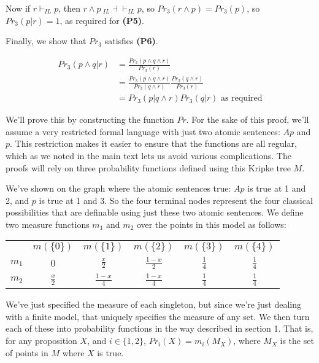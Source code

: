 Now if $r \vdash_{IL} p$, then $r \wedge p ~_{IL}\dashv \vdash_{IL} p$, so $Pr_3(r \wedge p) = Pr_3(p)$, so $Pr_3(p | r) = 1$, as required for \textbf{(P5)}.

Finally, we show that $Pr_3$ satisfies \textbf{(P6)}.

\begin{align}
Pr_3(p \wedge q | r) &= \frac{Pr_3(p \wedge q \wedge r)}{Pr_3(r)} \\
 &= \frac{Pr_3(p \wedge q \wedge r)}{Pr_3(q \wedge r)} \frac{Pr_3(q \wedge r)}{Pr_3(r)} \\
 &=Pr_3(p | q \wedge r) Pr_3(q | r) \text{ as required}
\end{align}

\TheoremSix

\noindent We'll prove this by constructing the function $Pr$. For the sake of this proof, we'll assume a very restricted formal language with just two atomic sentences: $Ap$ and $p$. This restriction makes it easier to ensure that the functions are all regular, which as we noted in the main text lets us avoid various complications. The proofs will rely on three probability functions defined using this Kripke tree $M$.

\ModelPictureTwo

\noindent We've shown on the graph where the atomic sentences true: $Ap$ is true at 1 and 2, and $p$ is true at 1 and 3. So the four terminal nodes represent the four classical possibilities that are definable using just these two atomic sentences. We define two measure functions $m_1$ and $m_2$ over the points in this model as follows:

\begin{center}
\begin{tabular}{r c c c c c}
 & $m(\{0\})$ & $m(\{1\})$ & $m(\{2\})$ & $m(\{3\})$ & $m(\{4\})$ \\
$m_1$ & 0 &  $\frac{x}{2}$ & $\frac{1-x}{2}$ & $\frac{1}{4}$ & $\frac{1}{4}$ \\
$m_2$ & $\frac{x}{2}$ & $\frac{1-x}{4}$ & $\frac{1-x}{4}$ & $\frac{1}{4}$ & $\frac{1}{4}$
\end{tabular}
\end{center}

\noindent We've just specified the measure of each singleton, but since we're just dealing with a finite model, that uniquely specifies the measure of any set. We then turn each of these into probability functions in the way described in section 1. That is, for any proposition $X$, and $i \in \{1, 2\}$, $Pr_i(X) = m_i(M_X)$, where $M_X$ is the set of points in $M$ where $X$ is true.

